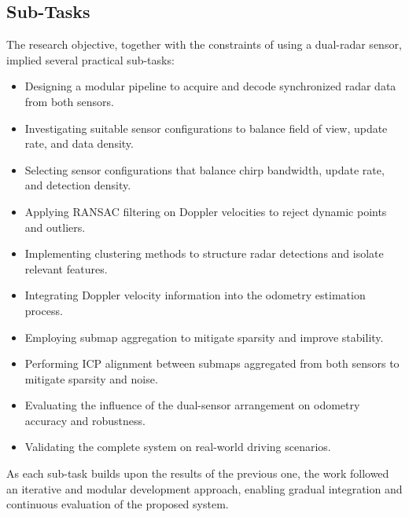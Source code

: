 \subsection{Sub-Tasks}

The research objective, together with the constraints of using a dual-radar sensor, implied several practical sub-tasks:  
\begin{itemize}
    \item Designing a modular pipeline to acquire and decode synchronized radar data from both sensors.
    \item Investigating suitable sensor configurations to balance field of view, update rate, and data density.  
    \item Selecting sensor configurations that balance chirp bandwidth, update rate, and detection density.
    \item Applying RANSAC filtering on Doppler velocities to reject dynamic points and outliers.
    \item Implementing clustering methods to structure radar detections and isolate relevant features.  
    \item Integrating Doppler velocity information into the odometry estimation process.   
    \item Employing submap aggregation to mitigate sparsity and improve stability. 
    \item Performing ICP alignment between submaps aggregated from both sensors to mitigate sparsity and noise. 
    \item Evaluating the influence of the dual-sensor arrangement on odometry accuracy and robustness. 
    \item Validating the complete system on real-world driving scenarios. 
\end{itemize}

As each sub-task builds upon the results of the previous one, the work followed an iterative and modular development approach, enabling gradual integration and continuous evaluation of the proposed system.  